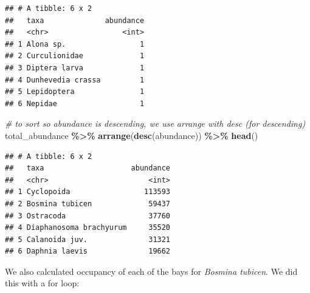 \documentclass[
]{article}
\newenvironment{Shaded}{\begin{snugshade}}{\end{snugshade}}
\newcommand{\CommentTok}[1]{\textcolor[rgb]{0.56,0.35,0.01}{\textit{#1}}}
\newcommand{\FunctionTok}[1]{\textcolor[rgb]{0.13,0.29,0.53}{\textbf{#1}}}
\newcommand{\NormalTok}[1]{#1}
\newcommand{\SpecialCharTok}[1]{\textcolor[rgb]{0.81,0.36,0.00}{\textbf{#1}}}
\begin{document}
\begin{verbatim}
## # A tibble: 6 x 2
##   taxa              abundance
##   <chr>                 <int>
## 1 Alona sp.                 1
## 2 Curculionidae             1
## 3 Diptera larva             1
## 4 Dunhevedia crassa         1
## 5 Lepidoptera               1
## 6 Nepidae                   1
\end{verbatim}

\begin{Shaded}
\begin{Highlighting}[]
\CommentTok{\# to sort so abundance is descending, we use arrange with desc (for descending)}
\NormalTok{total\_abundance }\SpecialCharTok{\%\textgreater{}\%} \FunctionTok{arrange}\NormalTok{(}\FunctionTok{desc}\NormalTok{(abundance)) }\SpecialCharTok{\%\textgreater{}\%} \FunctionTok{head}\NormalTok{()}
\end{Highlighting}
\end{Shaded}

\begin{verbatim}
## # A tibble: 6 x 2
##   taxa                    abundance
##   <chr>                       <int>
## 1 Cyclopoida                 113593
## 2 Bosmina tubicen             59437
## 3 Ostracoda                   37760
## 4 Diaphanosoma brachyurum     35520
## 5 Calanoida juv.              31321
## 6 Daphnia laevis              19662
\end{verbatim}

We also calculated occupancy of each of the bays for \emph{Bosmina
tubicen}. We did this with a for loop:
\end{document}
